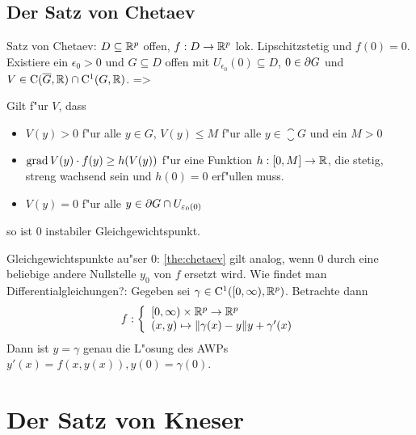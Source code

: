 \subsection{Der Satz von Chetaev}
\theorem Satz von Chetaev:
  $D\subseteq\mathbb R^p$ offen, $f:D\to\mathbb R^p$ lok. Lipschitzstetig und 
  $f(0)=0$. Existiere ein $\epsilon_0>0$ und $G\subseteq D$ offen mit
  $U_{\epsilon_0}(0)\subseteq D$, $0\in\partial{G}$ und 
  $V\in{\rm C}(\overline{G},\mathbb R)\cap{\rm C}^1(G,\mathbb R)$.
  =>{
  \label{the:chetaev}
  Gilt f"ur $V$, dass
  \begin{itemize}
    \item $V(y)>0$ f"ur alle $y\in G$, $V(y)\leq M$ f"ur alle $y\in\closure G$
      und ein $M>0$
    \item $\operatorname{grad} V(y)\cdot f(y)\geq h(V(y))$ f"ur eine Funktion 
      $h:[0,M]\to\mathbb R$, die stetig, streng wachsend sein und $h(0)=0$ erf"ullen
      muss.
    \item $V(y)=0$ f"ur alle $y\in\partial{G}\cap U_{\varepsilon_0(0)}$
    \end{itemize}
  so ist $0$ instabiler Gleichgewichtspunkt.
  }
\remark Gleichgewichtspunkte au"ser $0$:{
  \ref{the:chetaev} gilt analog, wenn $0$ durch eine beliebige andere 
  Nullstelle $y_0$ von $f$ ersetzt wird.
  }
\remark Wie findet man Differentialgleichungen?:{
  Gegeben sei $\gamma\in{\rm C}^1([0,\infty),\mathbb R^p)$. Betrachte dann
  \[f:\left\{\begin{array}{l}
      [0,\infty)\times\mathbb R^p\to\mathbb R^p\\
      (x,y)\mapsto {\left\| \gamma(x)-y\right\|}y+\gamma'(x)
      \end{array}\right.
    \]
  Dann ist $y=\gamma$ genau die L"osung des AWPs $y'(x)=f(x,y(x)),y(0)=\gamma(0)$.
  }
\section{Der Satz von Kneser}
